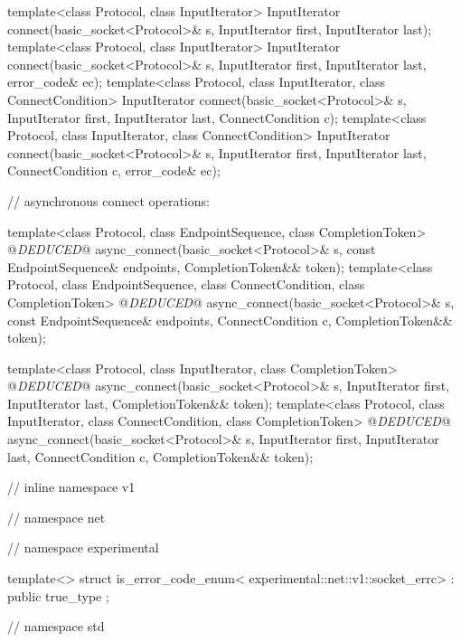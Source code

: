 \begin{codeblock}
{{{{  template<class Protocol, class InputIterator>
    InputIterator connect(basic_socket<Protocol>& s,
                          InputIterator first, InputIterator last);
  template<class Protocol, class InputIterator>
    InputIterator connect(basic_socket<Protocol>& s,
                          InputIterator first, InputIterator last,
                          error_code& ec);
  template<class Protocol, class InputIterator, class ConnectCondition>
    InputIterator connect(basic_socket<Protocol>& s,
                          InputIterator first, InputIterator last,
                          ConnectCondition c);
  template<class Protocol, class InputIterator, class ConnectCondition>
    InputIterator connect(basic_socket<Protocol>& s,
                          InputIterator first, InputIterator last,
                          ConnectCondition c,
                          error_code& ec);

  // asynchronous connect operations:

  template<class Protocol, class EndpointSequence, class CompletionToken>
    @\textit{DEDUCED}@ async_connect(basic_socket<Protocol>& s,
                          const EndpointSequence& endpoints,
                          CompletionToken&& token);
  template<class Protocol, class EndpointSequence,
    class ConnectCondition, class CompletionToken>
      @\textit{DEDUCED}@ async_connect(basic_socket<Protocol>& s,
                            const EndpointSequence& endpoints,
                            ConnectCondition c,
                            CompletionToken&& token);

  template<class Protocol, class InputIterator, class CompletionToken>
    @\textit{DEDUCED}@ async_connect(basic_socket<Protocol>& s,
                          InputIterator first, InputIterator last,
                          CompletionToken&& token);
  template<class Protocol, class InputIterator,
    class ConnectCondition, class CompletionToken>
      @\textit{DEDUCED}@ async_connect(basic_socket<Protocol>& s,
                            InputIterator first, InputIterator last,
                            ConnectCondition c,
                            CompletionToken&& token);

} // inline namespace v1
} // namespace net
} // namespace experimental

  template<> struct is_error_code_enum<
    experimental::net::v1::socket_errc>
      : public true_type {};

} // namespace std
\end{codeblock}

